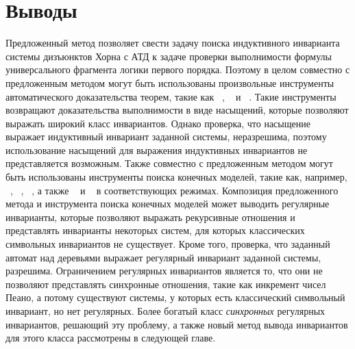 \section{Выводы}\label{sec:fmf/conclusion}
Предложенный метод позволяет свести задачу поиска индуктивного инварианта системы дизъюнктов Хорна с АТД к задаче проверки выполнимости формулы универсального фрагмента логики первого порядка.
Поэтому в целом совместно с предложенным методом могут быть использованы произвольные инструменты автоматического доказательства теорем, такие как \vampire{}~\cite{kovacs2013first}, \eprover{}~\cite{10.5555/1218615.1218621} и \zipperposition{}~\cite{10.1007/978-3-319-66167-4_10}.
Такие инструменты возвращают доказательства выполнимости в виде насыщений, которые позволяют выражать широкий класс инвариантов. Однако проверка, что насыщение выражает индуктивный инвариант заданной системы, неразрешима, поэтому использование насыщений для выражения индуктивных инвариантов не представляется возможным.
Также совместно с предложенным методом могут быть использованы инструменты поиска конечных моделей, такие как, например, \mace{}~\cite{https://doi.org/10.48550/arxiv.cs/0310055}, \kodkod{}~\cite{10.1007/978-3-540-71209-1_49}, \paradox{}~\cite{claessen2003new}, а также \cvc{}~\cite{reynolds2013finite} и \vampire{}~\cite{10.1007/978-3-319-40970-2_20} в соответствующих режимах. Композиция предложенного метода и инструмента поиска конечных моделей может выводить регулярные инварианты, которые позволяют выражать рекурсивные отношения и представлять инварианты некоторых систем, для которых классических символьных инвариантов не существует. Кроме того, проверка, что заданный автомат над деревьями выражает регулярный инвариант заданной системы, разрешима.
Ограничением регулярных инвариантов является то, что они не позволяют представлять синхронные отношения, такие как инкремент чисел Пеано, а потому существуют системы, у которых есть классический символьный инвариант, но нет регулярных.
Более богатый класс \emph{синхронных} регулярных инвариантов, решающий эту проблему, а также новый метод вывода инвариантов для этого класса рассмотрены в следующей главе.
